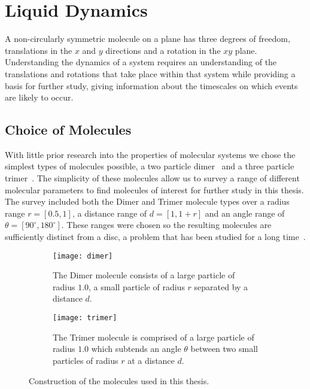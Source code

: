 \chapter{Liquid Dynamics}
\label{sec:dynamics}

A non-circularly symmetric molecule on a plane has three degrees of freedom, translations in the $x$ and $y$ directions and a rotation in the $xy$ plane. Understanding the dynamics of a system requires an understanding of the translations and rotations that take place within that system while providing a basis for further study, giving information about the timescales on which events are likely to occur.

\section{Choice of Molecules}

With little prior research into the properties of molecular systems we chose the simplest types of molecules possible, a two particle dimer~ and a three particle trimer~. The simplicity of these molecules allow us to survey a range of different molecular parameters to find molecules of interest for further study in this thesis. The survey included both the Dimer and Trimer molecule types over a radius range $r = [0.5,1]$, a distance range of $d = [1,1+r]$ and an angle range of $\theta = [90^\circ,180^\circ]$. These ranges were chosen so the resulting molecules are sufficiently distinct from a disc, a problem that has been studied for a long time~\cite{verlet:67}.

\begin{figure}
    \centering
    \begin{subfigure}[t]{0.48\textwidth}
        \texttt{[image: dimer]}
        \caption{The Dimer molecule consists of a large particle of radius $1.0$, a small particle of radius $r$ separated by a distance $d$.}
        \label{fig:dimer}
    \end{subfigure}\hfill
    \begin{subfigure}[t]{0.48\textwidth}
        \texttt{[image: trimer]}
        \caption{The Trimer molecule is comprised of a large particle of radius $1.0$ which subtends an angle $\theta$ between two small particles of radius $r$ at a distance $d$.}
        \label{fig:trimer}
    \end{subfigure}
    \caption{Construction of the molecules used in this thesis.}
    \label{fig:construction}
\end{figure}

